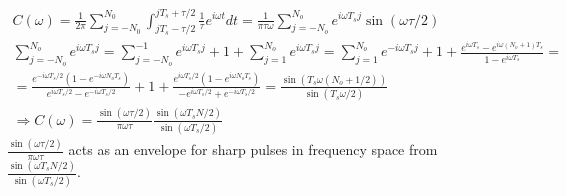 \documentclass[twoside,10pt]{amsart}
\begin{document}
\[
\begin{gathered}
  C(\omega) = \frac{1}{ 2\pi } \sum_{j = -N_0}^{N_0} \int_{jT_s - \tau/2}^{ j T_s + \tau/2} \frac{1}{\tau} e^{ i \omega t } dt = \frac{1}{  \pi \tau \omega} \sum_{j= -N_o}^{N_o} e^{i \omega T_s j } \sin{ (\omega \tau/2) } \\
  \sum_{j=-N_o}^{N_o} e^{i \omega T_s j} = \sum_{j=-N_o}^{-1} e^{ i \omega T_s j} + 1 + \sum_{j=1}^{N_o} e^{ i \omega T_s j } = \sum_{j=1}^{N_o} e^{ -i \omega T_s j } + 1 + \frac{ e^{ i \omega T_s} - e^{ i \omega (N_o+1) T_s } }{ 1 - e^{ i\omega T_s } } = \\
  = \frac{ e^{-i\omega T_s/2} ( 1 - e^{ -i \omega N_o T_s } ) }{ e^{ i \omega T_s/2 } - e^{ -i \omega T_s/2 } } + 1 + \frac{ e^{ i \omega T_s/2} ( 1 - e^{ i \omega N_o T_s } ) }{ -e^{ i \omega T_s/2} + e^{ -i \omega T_s /2 } } = \frac{ \sin{ ( T_s \omega (N_o + 1/2) ) } }{ \sin{ (T_s \omega/2) } } \\
  \Longrightarrow C(\omega) = \frac{ \sin{ (\omega \tau /2 )}}{ \pi \omega \tau } \frac{ \sin{ (\omega T_s N/2)}}{ \sin{ (\omega T_s/2 )} }
\end{gathered}
\]
$\frac{ \sin{ (\omega \tau /2 )}}{ \pi \omega \tau }$ acts as an envelope for sharp pulses in frequency space from $\frac{ \sin{ (\omega T_s N/2)}}{ \sin{ (\omega T_s/2 )} }$.  
\end{document}
